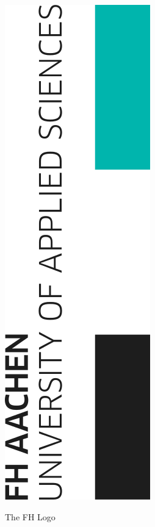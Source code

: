 \begin{figure}[htbp] %
	\caption{The FH Logo \autocite[]{Online:FhAachen}}
	\includegraphics[scale=0.7]{figures/FHLogoFromSVG.png}
	\label{figure:fhLogo} %
\end{figure}

